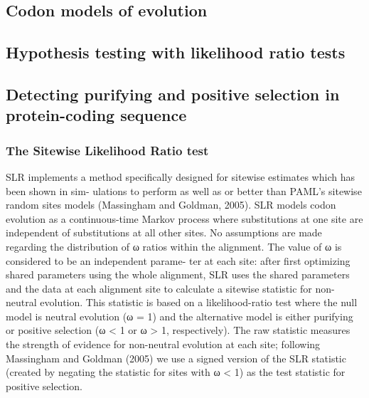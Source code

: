   \subsection{Codon models of evolution}

  \subsection{Hypothesis testing with likelihood ratio tests}

  \subsection{Detecting purifying and positive selection in protein-coding sequence}

  \subsubsection{The Sitewise Likelihood Ratio test}

  SLR implements a method specifically designed for sitewise estimates
  which has been shown in sim- ulations to perform as well as or
  better than PAML’s sitewise random sites models (Massingham and
  Goldman, 2005). SLR models codon evolution as a continuous-time
  Markov process where substitutions at one site are independent of
  substitutions at all other sites. No assumptions are made regarding
  the distribution of ω ratios within the alignment. The value of ω is
  considered to be an independent parame- ter at each site: after
  first optimizing shared parameters using the whole alignment, SLR
  uses the shared parameters and the data at each alignment site to
  calculate a sitewise statistic for non-neutral evolution.  This
  statistic is based on a likelihood-ratio test where the null model
  is neutral evolution (ω = 1) and the alternative model is either
  purifying or positive selection (ω < 1 or ω > 1, respectively). The
  raw statistic measures the strength of evidence for non-neutral
  evolution at each site; following Massingham and Goldman (2005) we
  use a signed version of the SLR statistic (created by negating the
  statistic for sites with ω < 1) as the test statistic for positive
  selection.



